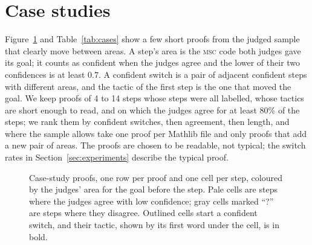 \section{Case studies}
\label{app:cases}

Figure~\ref{fig:cases} and Table~\ref{tab:cases} show a few short proofs from
the judged sample that clearly move between areas. A step's area is the
\textsc{msc} code both judges gave its goal; it counts as confident when the
judges agree and the lower of their two confidences is at least $0.7$. A
confident switch is a pair of adjacent confident steps with different areas,
and the tactic of the first step is the one that moved the goal. We keep proofs
of 4 to 14 steps whose steps were all labelled, whose tactics are short enough
to read, and on which the judges agree for at least 80\% of the steps; we rank
them by confident switches, then agreement, then length, and where the sample
allows take one proof per Mathlib file and only proofs that add a new pair of
areas. The proofs are chosen to be readable, not typical; the
switch rates in Section~\ref{sec:experiments} describe the typical proof.

\begin{figure}[t]
  \centering
  \caption{Case-study proofs, one row per proof and one cell per step, coloured
  by the judges' area for the goal before the step. Pale cells are steps where
  the judges agree with low confidence; gray cells marked ``?'' are steps where
  they disagree. Outlined cells start a confident switch, and their tactic,
  shown by its first word under the cell, is in bold.}
  \label{fig:cases}
\end{figure}

\begin{table}[h]
  \centering
  \caption{The case-study proofs of Figure~\ref{fig:cases}: theorem, Mathlib
  file, the sequence of confident areas, and each switching tactic with its
  step.}
  \label{tab:cases}
  \small
\end{table}
